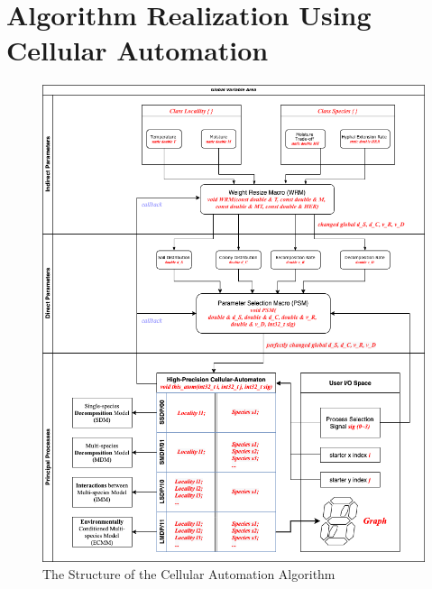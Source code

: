 \documentclass[12pt]{article}
\begin{document}
\section{Algorithm Realization Using Cellular Automation}
\begin{figure}[H]
	\small
	\centering
	\includegraphics[width=17cm]{./pictures/algorithm.png}
	\caption{The Structure of the Cellular Automation Algorithm}\label{jj}
\end{figure}
\end{document}
